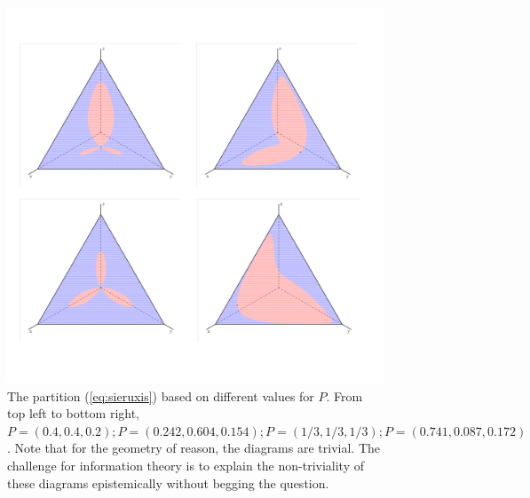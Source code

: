 \documentclass[12pt]{article}
\begin{document}
\begin{figure}[ht]
  \begin{flushright}
    \begin{minipage}[h]{\linewidth}
      \includegraphics[width=\textwidth]{concat2.png}
      \caption{\footnotesize The partition (\ref{eq:sieruxis}) based
        on different values for $P$. From top left to bottom right,
        $P=(0.4,0.4,0.2); P=(0.242,0.604,0.154); P=(1/3,1/3,1/3);
        P=(0.741,0.087,0.172)$.
        Note that for the geometry of reason, the diagrams are
        trivial. The challenge for information theory is to explain
        the non-triviality of these diagrams epistemically without
        begging the question.}
      \label{fig:concat}
    \end{minipage}
  \end{flushright}
\end{figure}
\end{document}
